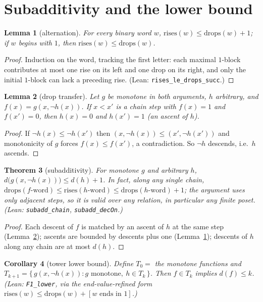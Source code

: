 \documentclass[11pt]{article}
\newtheorem{theorem}{Theorem}[section]
\newtheorem{lemma}[theorem]{Lemma}
\newtheorem{corollary}[theorem]{Corollary}
\theoremstyle{remark}
\begin{document}
\section{Subadditivity and the lower bound}\label{sec:subadd}

\begin{lemma}[alternation]\label{lem:alt}
For every binary word $w$,
$\mathrm{rises}(w)\le\mathrm{drops}(w)+1$; if $w$ begins with $1$, then
$\mathrm{rises}(w)\le\mathrm{drops}(w)$.
\end{lemma}

\begin{proof}
Induction on the word, tracking the first letter: each maximal $1$-block
contributes at most one rise on its left and one drop on its right, and only
the initial $1$-block can lack a preceding rise. (Lean:
\texttt{rises\_le\_drops\_succ}.)
\end{proof}

\begin{lemma}[drop transfer]\label{lem:transfer}
Let $g$ be monotone in both arguments, $h$ arbitrary, and
$f(x)=g(x,\neg h(x))$. If $x<x'$ is a chain step with $f(x)=1$ and
$f(x')=0$, then $h(x)=0$ and $h(x')=1$ (an ascent of $h$).
\end{lemma}

\begin{proof}
If $\neg h(x)\le\neg h(x')$ then $(x,\neg h(x))\le(x',\neg h(x'))$ and
monotonicity of $g$ forces $f(x)\le f(x')$, a contradiction. So $\neg h$
descends, i.e.\ $h$ ascends.
\end{proof}

\begin{theorem}[subadditivity]\label{thm:subadd}
For monotone $g$ and arbitrary $h$,
$d\bigl(g(x,\neg h(x))\bigr)\le d(h)+1$. In fact, along any single chain,
$\mathrm{drops}(f\text{-word})\le\mathrm{rises}(h\text{-word})
\le\mathrm{drops}(h\text{-word})+1$; the argument uses only adjacent steps,
so it is valid over any relation, in particular any finite poset.
(Lean: \texttt{subadd\_chain}, \texttt{subadd\_decOn}.)
\end{theorem}

\begin{proof}
Each descent of $f$ is matched by an ascent of $h$ at the same step
(Lemma~\ref{lem:transfer}); ascents are bounded by descents plus one
(Lemma~\ref{lem:alt}); descents of $h$ along any chain are at most $d(h)$.
\end{proof}

\begin{corollary}[tower lower bound]\label{cor:lower}
Define $T_0=$ the monotone functions and
$T_{k+1}=\{\,g(x,\neg h(x)) : g\text{ monotone},\ h\in T_k\,\}$. Then
$f\in T_k$ implies $d(f)\le k$. (Lean: \texttt{F1\_lower}, via the
end-value-refined form
$\mathrm{rises}(w)\le\mathrm{drops}(w)+[w\text{ ends in }1]$.)
\end{corollary}
\end{document}
